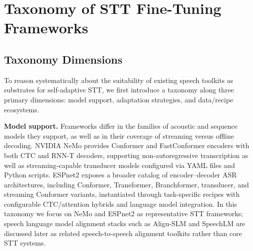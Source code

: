 \documentclass[conference]{IEEEtran}
\begin{document}

\pagebreak

\section{Taxonomy of STT Fine-Tuning Frameworks}
%
%

\label{sec:taxonomy}

\subsection{Taxonomy Dimensions}

To reason systematically about the suitability of existing speech toolkits as substrates for self-adaptive STT, we first introduce a taxonomy along three primary dimensions: model support, adaptation strategies, and data/recipe ecosystems.

\textbf{Model support.}
Frameworks differ in the families of acoustic and sequence models they support, as well as in their coverage of streaming versus offline decoding.
NVIDIA NeMo provides Conformer and FastConformer encoders with both CTC and RNN-T decoders, supporting non-autoregressive transcription as well as streaming-capable transducer models configured via YAML files and Python scripts.
ESPnet2 exposes a broader catalog of encoder--decoder ASR architectures, including Conformer, Transformer, Branchformer, transducer, and streaming Conformer variants, instantiated through task-specific recipes with configurable CTC/attention hybrids and language model integration.
In this taxonomy we focus on NeMo and ESPnet2 as representative STT frameworks; speech language model alignment stacks such as Align-SLM and SpeechLM are discussed later as related speech-to-speech alignment toolkits rather than core STT systems.
\end{document}
